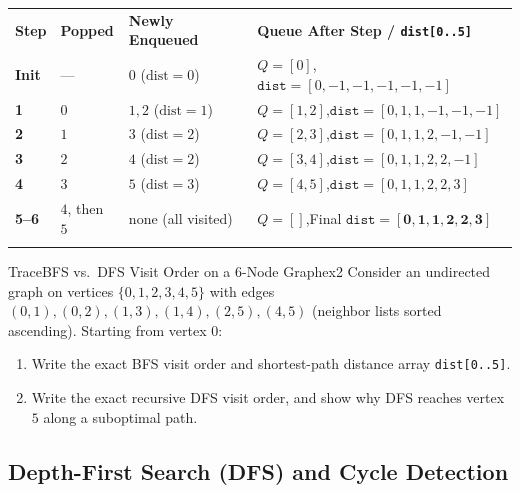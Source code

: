 \documentclass[11pt,a4paper]{article}
\theoremstyle{definition}
\begin{document}
\begin{center}
\begingroup\footnotesize{}
\begin{tabularx}{\textwidth}{>{\centering\arraybackslash\bfseries}p{1.2cm} >{\raggedright\arraybackslash}p{2.3cm} >{\raggedright\arraybackslash}p{3.4cm} >{\raggedright\arraybackslash}X}
\arrayrulecolor{primaryblue}\toprule[1.1pt]
\rowcolor{primaryblue!10}
\textcolor{primaryblue}{\textbf{Step}} & \textcolor{primaryblue}{\textbf{Popped}} & \textcolor{primaryblue}{\textbf{Newly Enqueued}} & \textcolor{primaryblue}{\textbf{Queue After Step / \texttt{dist[0..5]}}} \\
\arrayrulecolor{codeframe}\midrule[0.6pt]
Init & --- & $0$ ($\text{dist} = 0$) & $Q = [0]$,\quad $\texttt{dist} = [0, -1, -1, -1, -1, -1]$ \\
1 & $0$ & $1, 2$ ($\text{dist} = 1$) & $Q = [1, 2]$,\quad $\texttt{dist} = [0, 1, 1, -1, -1, -1]$ \\
2 & $1$ & $3$ ($\text{dist} = 2$) & $Q = [2, 3]$,\quad $\texttt{dist} = [0, 1, 1, 2, -1, -1]$ \\
3 & $2$ & $4$ ($\text{dist} = 2$) & $Q = [3, 4]$,\quad $\texttt{dist} = [0, 1, 1, 2, 2, -1]$ \\
4 & $3$ & $5$ ($\text{dist} = 3$) & $Q = [4, 5]$,\quad $\texttt{dist} = [0, 1, 1, 2, 2, 3]$ \\
5--6 & $4$, then $5$ & none (all visited) & $Q = []$,\quad Final $\texttt{dist} = \mathbf{[0, 1, 1, 2, 2, 3]}$ \\
\arrayrulecolor{primaryblue}\bottomrule[1.1pt]
\end{tabularx}\endgroup
\end{center}

\begin{tryitbox}{Trace}{BFS vs.\ DFS Visit Order on a 6-Node Graph}{ex2}
Consider an undirected graph on vertices $\{0, 1, 2, 3, 4, 5\}$ with edges $(0,1), (0,2), (1,3), (1,4), (2,5), (4,5)$ (neighbor lists sorted ascending). Starting from vertex $0$:
\begin{enumerate}
    \item Write the exact BFS visit order and shortest-path distance array \texttt{dist[0..5]}.
    \item Write the exact recursive DFS visit order, and show why DFS reaches vertex $5$ along a suboptimal path.
\end{enumerate}
\end{tryitbox}

\subsection{Depth-First Search (DFS) and Cycle Detection}
\end{document}
